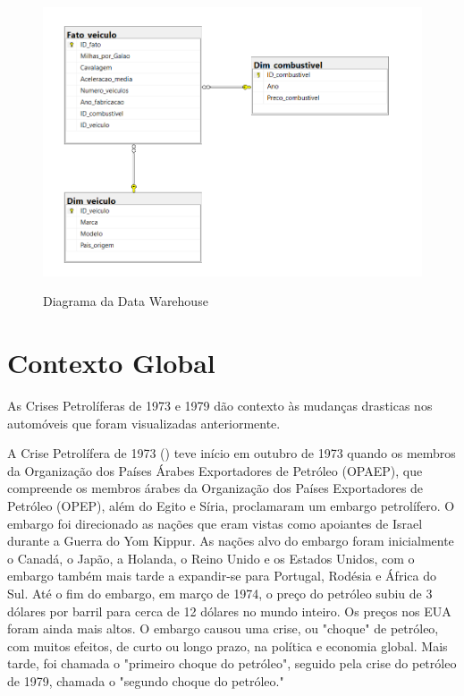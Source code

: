 \documentclass[a4paper]{article}
\begin{document}
\begin{figure}[h!]
    \centering
    \includegraphics[width=1\textwidth]{Recursos/DiagramaCrisePetroleo.png} %
    \vspace{0.5cm}
    \label{fig:dcri}
    \caption{Diagrama da Data Warehouse}
\end{figure}
\newpage
\section{Contexto Global}\label{cg}
As Crises Petrolíferas de 1973 e 1979 dão contexto às mudanças drasticas nos automóveis que foram visualizadas anteriormente.

A Crise Petrolífera de 1973 (\cite{pet73}) teve início em outubro de 1973 quando os membros da 
Organização dos Países Árabes Exportadores de Petróleo (OPAEP), que compreende os membros árabes da 
Organização dos Países Exportadores de Petróleo (OPEP), além do Egito e Síria, proclamaram um embargo petrolífero. 
O embargo foi direcionado as nações que eram vistas como apoiantes de Israel durante a Guerra do Yom Kippur. 
As nações alvo do embargo foram inicialmente o Canadá, o Japão, a Holanda, o Reino Unido e os Estados Unidos, 
com o embargo também mais tarde a expandir-se para Portugal, Rodésia e África do Sul. Até o fim do embargo, em março de 1974, 
o preço do petróleo subiu de 3 dólares por barril para cerca de 12 dólares no mundo inteiro. Os preços nos EUA foram ainda mais altos. 
O embargo causou uma crise, ou "choque" de petróleo, com muitos efeitos, de curto ou longo prazo, na política e economia global. 
Mais tarde, foi chamada o "primeiro choque do petróleo", seguido pela crise do petróleo de 1979, chamada o "segundo choque do petróleo."
\end{document}
